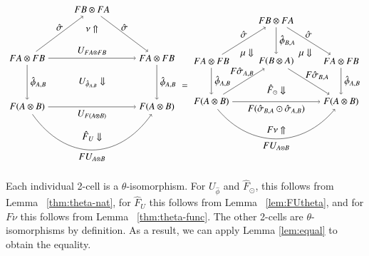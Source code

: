 \documentclass{amsart}
\begin{document}
\begin{equation}
\begin{aligned}
\begin{tikzpicture}[xscale=1.2, yscale=1.8]
\node (t) at (2,3) {$FB \otimes FA$};
\node (tl) at (0,2) {$FA \otimes FB$};
\node (bl) at (0,1) {$F(A\otimes B)$};
\node (tr) at (4,2) {$FA \otimes FB$};
\node (br) at (4,1) {$F(A\otimes B)$};
\draw[->] (t) to node [above] {$\hat{\sigma}$} (tr);
\draw[->] (tr) to node [right] {$\hat{\phi}_{A,B}$} (br);
\draw[->] (tl) to node [above] {$\hat{\sigma}$} (t);
\draw[->] (tl) to node [right] {$\hat{\phi}_{A,B}$} (bl);
\draw[->] (tl) to node [above] {$U_{FA \otimes FB}$} (tr);
\draw[->] (bl) to[in=-135, out=-45] node [below] {$FU_{A\otimes B}$} (br);
\draw[->] (bl) to node [below] {$U_{F(A \otimes B)}$} (br);
\node at (2,2.6) {$\nu \Uparrow$};
\node at (2,1.5) {$U_{\hat{\phi}_{A,B}} \Downarrow$};
\node at (2, 0.4) {$\hat{F}_U \Downarrow$};
\end{tikzpicture}
\end{aligned}
=
\begin{aligned}
\begin{tikzpicture}[xscale=1.2, yscale=1.5]
\node (t) at (2,3) {$FB \otimes FA$};
\node (tl) at (0,2) {$FA \otimes FB$};
\node (bl) at (0,1) {$F(A\otimes B)$};
\node (m) at (2,2) {$F(B\otimes A)$};
\node (tr) at (4,2) {$FA \otimes FB$};
\node (br) at (4,1) {$F(A\otimes B)$};
\draw[->] (t) to node [above] {$\hat{\sigma}$} (tr);
\draw[->] (t) to node [right] {$\hat{\phi}_{B,A}$} (m);
\draw[->] (tr) to node [right] {$\hat{\phi}_{A,B}$} (br);
\draw[->] (tl) to node [above] {$\hat{\sigma}$} (t);
\draw[->] (tl) to node [right] {$\hat{\phi}_{A,B}$} (bl);
\draw[->] (bl) to node [left,yshift=10pt, xshift=14pt] {$F\hat{\sigma}_{A,B}$} (m);
\draw[->] (m) to node [right,xshift=-7,yshift=6] {$F{\hat{\sigma}}_{B,A}$} (br);
\draw[->] (bl) to[in=-135, out=-45] node [below] {$FU_{A\otimes B}$} (br);
\draw[->] (bl) to node [below] {$F({\hat{\sigma}}_{B,A} \odot {\hat{\sigma}}_{A, B})$} (br);
\node at (1.1,2.2) {$\mu \Downarrow$};
\node at (2.9,2.2) {$\mu \Downarrow$};
\node at (2,1.3) {$ \hat{F}_{\odot} \Downarrow$};
\node at (2, 0.3) {$F\nu \Uparrow$};
\end{tikzpicture}
\end{aligned}
\end{equation} 

Each individual 2-cell is a $\theta$-isomorphism. For $U_{\hat{\phi}}$ and $\hat{F}_{\odot}$, 
this follows from Lemma ~\ref{thm:theta-nat}, for $\hat{F}_{U}$ this follows from Lemma ~\ref{lem:FUtheta}, and for $F \nu$ this follows from Lemma ~\ref{thm:theta-func}. The other 2-cells are $\theta$-isomorphisms by definition.
As a result, we can apply Lemma \ref{lem:equal} to obtain the equality.  
\end{document}
